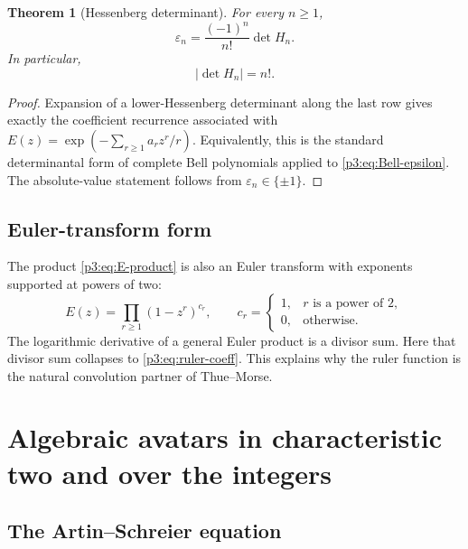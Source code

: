 \documentclass[11pt,oneside]{article}
\newtheorem{theorem}{Theorem}[section]
\theoremstyle{definition}
\theoremstyle{remark}
\newcommand{\eps}{\varepsilon}
\begin{document}
\begin{theorem}[Hessenberg determinant]\label{p3:thm:Hessenberg}
For every $n\ge1$,
\begin{equation}\label{p3:eq:Hessenberg-epsilon}
 \boxed{\qquad
 \eps_n=\frac{(-1)^n}{n!}\det H_n.
 \qquad}
\end{equation}
In particular,
\begin{equation}\label{p3:eq:Hessenberg-factorial}
 |\det H_n|=n!.
\end{equation}
\end{theorem}

\begin{proof}
Expansion of a lower-Hessenberg determinant along the last row gives exactly
the coefficient recurrence associated with
$E(z)=\exp(-\sum_{r\ge1}a_rz^r/r)$.  Equivalently, this is the standard
determinantal form of complete Bell polynomials applied to
\cref{p3:eq:Bell-epsilon}.  The absolute-value statement follows from
$\eps_n\in\{\pm1\}$.
\end{proof}

\subsection{Euler-transform form}

The product \cref{p3:eq:E-product} is also an Euler transform with exponents
supported at powers of two:
\begin{equation}\label{p3:eq:euler-transform}
 E(z)=\prod_{r\ge1}(1-z^r)^{c_r},
 \qquad
 c_r=\begin{cases}1,&r\text{ is a power of }2,\\0,&\text{otherwise.}\end{cases}
\end{equation}
The logarithmic derivative of a general Euler product is a divisor sum.  Here
that divisor sum collapses to \cref{p3:eq:ruler-coeff}.  This explains why the
ruler function is the natural convolution partner of Thue--Morse.

\section{Algebraic avatars in characteristic two and over the integers}

\subsection{The Artin--Schreier equation}
\end{document}
